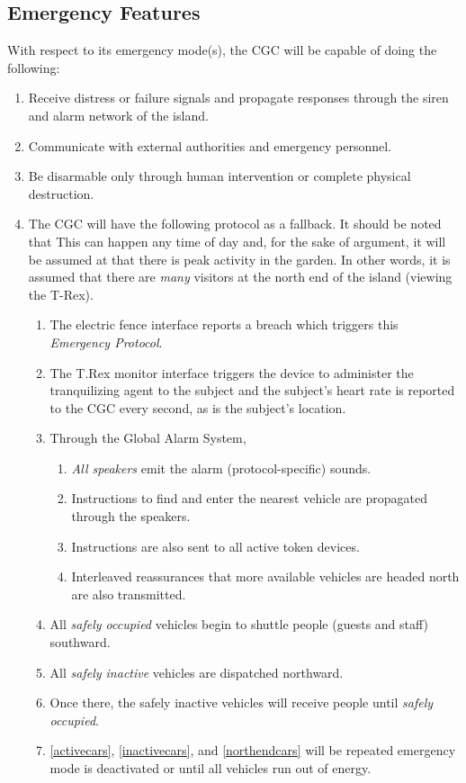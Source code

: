 \documentclass[12pt]{article}
\begin{document}
	\subsection{Emergency Features}
	With respect to its emergency mode(s), the CGC will be capable of doing the following:
	\begin{enumerate}
		\item Receive distress or failure signals and propagate responses through the siren and 
		alarm network of the island. 
		\item Communicate with external authorities and emergency personnel.
		\item Be disarmable only through human intervention or complete physical destruction.
		\item The CGC will have the following protocol as a fallback. It should be noted that This can happen 
		any time of day and, for the sake of argument, it will be assumed at that there is peak activity in the garden. 
		In other words, it is assumed that there are \textit{many} visitors at the north end of the island (viewing the T-Rex). 
			\begin{enumerate}
				\item The electric fence interface reports a breach which triggers this \textit{Emergency Protocol}.
				\item The T.Rex monitor interface triggers the device to administer the tranquilizing agent to the subject
				and the subject's heart rate is reported to the CGC every second, as is the subject's location.
				\item Through the Global Alarm System,
					\begin{enumerate}
						\item \textit{All speakers} emit the alarm (protocol-specific) sounds.
						\item Instructions to find and enter the nearest vehicle are propagated through the speakers. 
						\item Instructions are also sent to all active token devices.
						\item Interleaved reassurances that more available vehicles are headed north are also transmitted. 
					\end{enumerate}
				\item{\label{activecars} All \textit{safely occupied} vehicles begin to shuttle people (guests and staff) southward.}
				\item{\label{inactivecars} All \textit{safely inactive} vehicles are dispatched northward.}
				\item{\label{northendcars} Once there, the {safely inactive} vehicles will receive people until \textit{safely occupied}.} 
				\item \ref{activecars}, \ref{inactivecars}, and \ref{northendcars} will be repeated emergency mode is deactivated or until
				all vehicles run out of energy.
			\end{enumerate}
	\end{enumerate}
	
\end{document}

